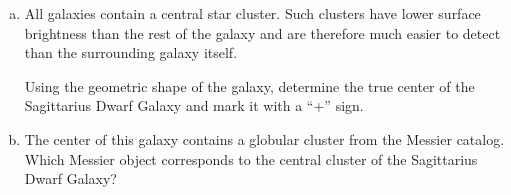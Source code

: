 \documentclass[a4paper,12pt]{extarticle}
\begin{document}
{\begin{enumerate}[a.]
		Using the data for these stars, draw the galaxy on the chart.
		
		\item
		All galaxies contain a central star cluster. Such clusters have lower surface brightness than the rest of the galaxy and are therefore much easier to detect than the surrounding galaxy itself.
		
		Using the geometric shape of the galaxy, determine the true center of the Sagittarius Dwarf Galaxy and mark it with a ``+'' sign.
		
		\item
		The center of this galaxy contains a globular cluster from the Messier catalog. Which Messier object corresponds to the central cluster of the Sagittarius Dwarf Galaxy?
	\end{enumerate}}
	
\end{document}

